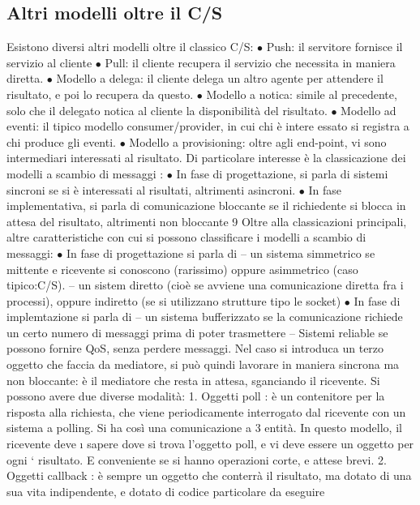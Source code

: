 \subsection{Altri modelli oltre il C/S}
Esistono diversi altri modelli oltre il classico C/S:
$\bullet$ Push: il servitore fornisce il servizio al cliente
$\bullet$ Pull: il cliente recupera il servizio che necessita in maniera diretta.
$\bullet$ Modello a delega: il cliente delega un altro agente per attendere il risultato,
e poi lo recupera da questo.
$\bullet$ Modello a notica: simile al precedente, solo che il delegato notica al
cliente la disponibilità del risultato.
$\bullet$ Modello ad eventi: il tipico modello consumer/provider, in cui chi è intere
essato si registra a chi produce gli eventi.
$\bullet$ Modello a provisioning: oltre agli end-point, vi sono intermediari interessati al risultato.
Di particolare interesse è la classicazione dei modelli a scambio di messaggi :
$\bullet$ In fase di progettazione, si parla di sistemi sincroni se si è interessati al
risultati, altrimenti asincroni.
$\bullet$ In fase implementativa, si parla di comunicazione bloccante se il richiedente
si blocca in attesa del risultato, altrimenti non bloccante
9
Oltre alla classicazioni principali, altre caratteristiche con cui si possono classificare i modelli a scambio di
messaggi:
$\bullet$ In fase di progettazione si parla di
-- un sistema simmetrico se mittente e ricevente si conoscono (rarissimo) oppure asimmetrico (caso tipico:C/S).
-- un sistem diretto (cioè se avviene una comunicazione diretta fra i
processi), oppure indiretto (se si utilizzano strutture tipo le socket)
$\bullet$ In fase di implemtazione si parla di
-- un sistema bufferizzato se la comunicazione richiede un certo numero
di messaggi prima di poter trasmettere
-- Sistemi reliable se possono fornire QoS, senza perdere messaggi.
Nel caso si introduca un terzo oggetto che faccia da mediatore, si può quindi
lavorare in maniera sincrona ma non bloccante: è il mediatore che resta in
attesa, sganciando il ricevente. Si possono avere due diverse modalità:
1. Oggetti poll : è un contenitore per la risposta alla richiesta, che viene
periodicamente interrogato dal ricevente con un sistema a polling. Si ha
così una comunicazione a 3 entità. In questo modello, il ricevente deve
\i{}
sapere dove si trova l'oggetto poll, e vi deve essere un oggetto per ogni
`
risultato. E conveniente se si hanno operazioni corte, e attese brevi.
2. Oggetti callback : è sempre un oggetto che conterrà il risultato, ma dotato
di una sua vita indipendente, e dotato di codice particolare da eseguire
